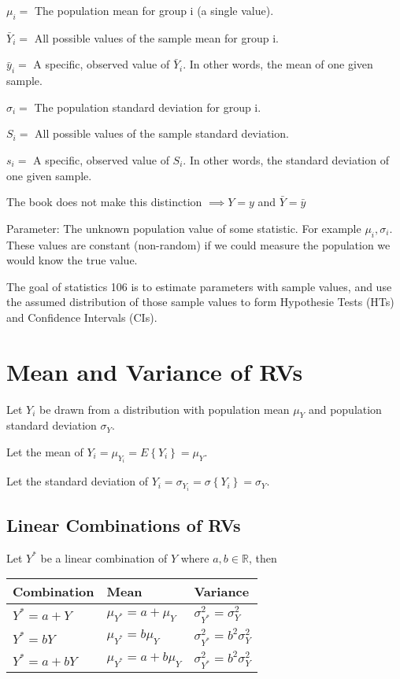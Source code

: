 \documentclass[10pt]{article}
\newcommand{\define}[1]{\colorbox{Thistle2}{#1}}
\newcommand{\emphas}[1]{\colorbox{DarkSeaGreen2}{#1}}
\newcommand{\mean}[1]{\mu_{#1}}
\renewcommand{\exp}[1]{E\left\{#1\right\}} %
\newcommand{\dev}[1]{\sigma\left\{#1\right\}}
\newcommand{\sigvar}[1]{\sigma^2_{#1}} %
\newcommand{\sigdev}[1]{\sigma_{#1}}
\begin{document}
\begin{multicols}{3}
    $\mu_i=$ The population mean for group i (a single value).

    $\bar Y_i =$ All possible values of the sample mean for group i.

    $\bar y_i =$ A specific, observed value of $\bar Y_i$. In other words, the mean of one given sample.

    $\sigma_i =$ The population standard deviation for group i.

    $S_i=$ All possible values of the sample standard deviation.

    $s_i=$ A specific, observed value of $S_i$. In other words, the standard deviation of one given sample.

    The book does not make this distinction $\implies Y=y$ and $\bar Y = \bar y$

    \define{Parameter}: The unknown population value of some statistic. For example $\mu_i, \sigma_i$. These values are constant (non-random) if we could measure the population we would know the true value.

    The goal of statistics 106 is to estimate parameters with sample values, and use the assumed distribution of those sample values to form \emphas{Hypothesie Tests (HTs)} and \emphas{Confidence Intervals (CIs)}.

    \section{Mean and Variance of RVs}

    Let $Y_i$ be drawn from a distribution with population mean $\mu_Y$ and population standard deviation $\sigma_Y$.

    Let the \define{mean} of $Y_i = \mean{Y_i} = \exp{Y_i} = \mean{Y}$.

    Let the \define{standard deviation} of $Y_i = \sigdev{Y_i} = \dev{Y_i} = \sigdev{Y}$.

    \subsection{Linear Combinations of RVs}

    Let $Y^*$ be a linear combination of $Y$ where $a,b \in \mathbb{R}$, then

    \begin{center}
        \begin{tabular}{l | l | l}
            Combination    & Mean                         & Variance                        \\ \hline
            $Y^* = a + Y$  & $\mean{Y^*} = a + \mean{Y}$  & $\sigvar{Y^*} = \sigvar{Y}$     \\
            $Y^* = bY$     & $\mean{Y^*} = b\mean{Y}$     & $\sigvar{Y^*} = b^2 \sigvar{Y}$ \\
            $Y^* = a + bY$ & $\mean{Y^*} = a + b\mean{Y}$ & $\sigvar{Y^*} = b^2 \sigvar{Y}$
        \end{tabular}
    \end{center}


\end{multicols}
\end{document}
